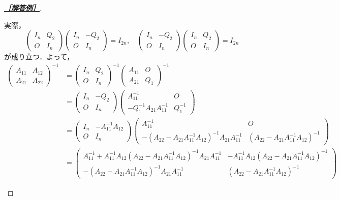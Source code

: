 \documentclass[uplatex,dvipdfmx]{jsarticle}
\begin{document}
\begin{proof}[\textbf{\underline{［解答例］}}]
\begin{enumerate}
        実際，
        \[\begin{pmatrix}I_n&Q_2\\O&I_n\end{pmatrix}\begin{pmatrix}I_n&-Q_2\\O&I_n\end{pmatrix}=I_{2n},\quad \begin{pmatrix}I_n&-Q_2\\O&I_n\end{pmatrix}\begin{pmatrix}I_n&Q_2\\O&I_n\end{pmatrix}=I_{2n}\]
        が成り立つ．よって，
        \begin{align*}
            \begin{pmatrix}
                A_{11}&A_{12}\\A_{21}&A_{22}
            \end{pmatrix}^{-1}&=\begin{pmatrix}I_n&Q_2\\O&I_n\end{pmatrix}^{-1}\begin{pmatrix}A_{11}&O\\A_{21}&Q_1\end{pmatrix}^{-1}\\
            &=\begin{pmatrix}I_n&-Q_2\\O&I_n\end{pmatrix}\begin{pmatrix}A_{11}^{-1}&O\\-Q_1^{-1}A_{21}A_{11}^{-1}&Q_1^{-1}\end{pmatrix}\\
            &=\begin{pmatrix}I_n&-A_{11}^{-1}A_{12}\\O&I_n\end{pmatrix}\begin{pmatrix}A_{11}^{-1}&O\\-(A_{22}-A_{21}A_{11}^{-1}A_{12})^{-1}A_{21}A_{11}^{-1}&(A_{22}-A_{21}A_{11}^{-1}A_{12})^{-1}\end{pmatrix}\\
            &=\begin{pmatrix}A_{11}^{-1}+A_{11}^{-1}A_{12}(A_{22}-A_{21}A_{11}^{-1}A_{12})^{-1}A_{21}A_{11}^{-1}&-A_{11}^{-1}A_{12}(A_{22}-A_{21}A_{11}^{-1}A_{12})^{-1}\\-(A_{22}-A_{21}A_{11}^{-1}A_{12})^{-1}A_{21}A_{11}^{-1}&(A_{22}-A_{21}A_{11}^{-1}A_{12})^{-1}\end{pmatrix}

\end{align*}
\end{enumerate}
\end{proof}
\end{document}
